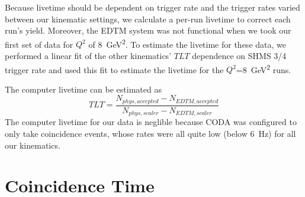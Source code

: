 Because livetime should be dependent on trigger rate and the trigger rates
varied between our kinematic settings, we calculate a per-run livetime to
correct each run's yield.
Moreover, the EDTM system was not functional when we took our first set of data
for $Q^2$ of \SI{8}{\giga\electronvolt\squared}.
To estimate the livetime for these data, we performed a linear fit of the other
kinematics' $TLT$ dependence on SHMS 3/4 trigger rate and used this fit to
estimate the livetime for the $Q^2$=\SI{8}{\giga\electronvolt\squared} runs.


The computer livetime can be estimated as
\begin{equation}
    TLT = \frac{N_{phys,accepted}-N_{EDTM,accepted}}{N_{phys,scaler}-N_{EDTM,scaler}}
\end{equation}
The computer livetime for our data is neglible because CODA was configured to
only take coincidence events, whose rates were all quite low (below
\SI{6}{\hertz}) for all our kinematics.



\section{Coincidence Time}
